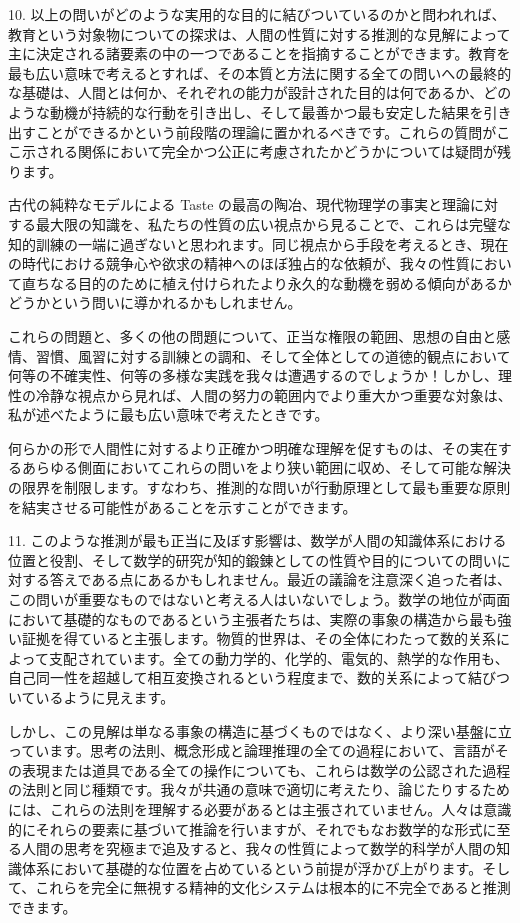 \documentclass[a4paper,11pt,openany]{ltjsbook}
\begin{document}
10. 以上の問いがどのような実用的な目的に結びついているのかと問われれば、教育という対象物についての探求は、人間の性質に対する推測的な見解によって主に決定される諸要素の中の一つであることを指摘することができます。教育を最も広い意味で考えるとすれば、その本質と方法に関する全ての問いへの最終的な基礎は、人間とは何か、それぞれの能力が設計された目的は何であるか、どのような動機が持続的な行動を引き出し、そして最善かつ最も安定した結果を引き出すことができるかという前段階の理論に置かれるべきです。これらの質問がここ示される関係において完全かつ公正に考慮されたかどうかについては疑問が残ります。

古代の純粋なモデルによる Taste の最高の陶冶、現代物理学の事実と理論に対する最大限の知識を、私たちの性質の広い視点から見ることで、これらは完璧な知的訓練の一端に過ぎないと思われます。同じ視点から手段を考えるとき、現在の時代における競争心や欲求の精神へのほぼ独占的な依頼が、我々の性質において直ちなる目的のために植え付けられたより永久的な動機を弱める傾向があるかどうかという問いに導かれるかもしれません。

これらの問題と、多くの他の問題について、正当な権限の範囲、思想の自由と感情、習慣、風習に対する訓練との調和、そして全体としての道徳的観点において何等の不確実性、何等の多様な実践を我々は遭遇するのでしょうか！しかし、理性の冷静な視点から見れば、人間の努力の範囲内でより重大かつ重要な対象は、私が述べたように最も広い意味で考えたときです。

何らかの形で人間性に対するより正確かつ明確な理解を促すものは、その実在するあらゆる側面においてこれらの問いをより狭い範囲に収め、そして可能な解決の限界を制限します。すなわち、推測的な問いが行動原理として最も重要な原則を結実させる可能性があることを示すことができます。

11. このような推測が最も正当に及ぼす影響は、数学が人間の知識体系における位置と役割、そして数学的研究が知的鍛錬としての性質や目的についての問いに対する答えである点にあるかもしれません。最近の議論を注意深く追った者は、この問いが重要なものではないと考える人はいないでしょう。数学の地位が両面において基礎的なものであるという主張者たちは、実際の事象の構造から最も強い証拠を得ていると主張します。物質的世界は、その全体にわたって数的关系によって支配されています。全ての動力学的、化学的、電気的、熱学的な作用も、自己同一性を超越して相互変換されるという程度まで、数的关系によって結びついているように見えます。

しかし、この見解は単なる事象の構造に基づくものではなく、より深い基盤に立っています。思考の法則、概念形成と論理推理の全ての過程において、言語がその表現または道具である全ての操作についても、これらは数学の公認された過程の法則と同じ種類です。我々が共通の意味で適切に考えたり、論じたりするためには、これらの法則を理解する必要があるとは主張されていません。人々は意識的にそれらの要素に基づいて推論を行いますが、それでもなお数学的な形式に至る人間の思考を究極まで追及すると、我々の性質によって数学的科学が人間の知識体系において基礎的な位置を占めているという前提が浮かび上がります。そして、これらを完全に無視する精神的文化システムは根本的に不完全であると推測できます。
\end{document}
